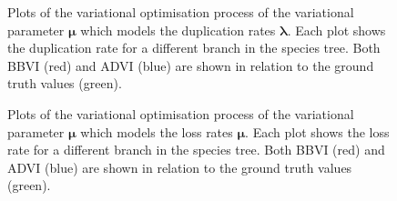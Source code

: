 \begin{figure}
	\centering
	\noindent{}
	\caption[Beluga simulation: VI optimisation comparison for $\lambda$.]{Plots of the variational optimisation process of the variational parameter $\bm\mu$ which models the duplication rates $\bm\lambda$. Each plot shows the duplication rate for a different branch in the species tree. Both BBVI (red) and ADVI (blue) are shown in relation to the ground truth values (green).}
    \label{fig:beluga-sim-opt-lambda}
\end{figure}

\begin{figure}
	\centering
	\noindent{}
	\caption[Beluga simulation: VI optimisation comparison for $\mu$.]{Plots of the variational optimisation process of the variational parameter $\bm\mu$ which models the loss rates $\bm\mu$. Each plot shows the loss rate for a different branch in the species tree. Both BBVI (red) and ADVI (blue) are shown in relation to the ground truth values (green).}
    \label{fig:beluga-sim-opt-mu}
\end{figure}


